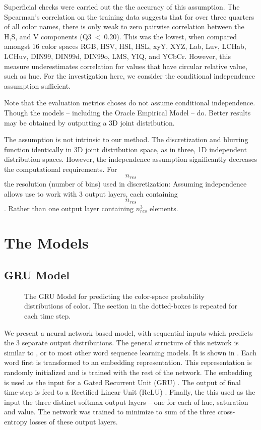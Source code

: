 \documentclass[11pt,letterpaper]{article}
\newcommand{\parencite}{\cite}
\begin{document}
Superficial checks were carried out the the accuracy of this assumption.
The Spearman's correlation on the training data suggests that for over three quarters of all color names, there is only weak to zero pairwise correlation between the H,S, and V components (\mbox{Q3 < 0.20}).
This was the lowest, when compared amongst 16 color spaces RGB, HSV, HSI, HSL, xyY, XYZ, Lab, Luv, LCHab, LCHuv, DIN99, DIN99d, DIN99o, LMS, YIQ, and YCbCr.
However, this measure underestimates correlation for values that have circular relative value, such as hue.
For the investigation here, we consider the conditional independence assumption sufficient.



Note that the evaluation metrics choses do not assume conditional independence.
Though the models -- including the Oracle Empirical Model -- do.
Better results may be obtained by outputting a 3D joint distribution.

The assumption is not intrinsic to our method.
The discretization and blurring function identically in 3D joint distribution space,
as in three, 1D independent distribution spaces.
However, the independence assumption significantly decreases the computational requirements.
For $$n_{res}$$ the resolution (number of bins) used in discretization:
Assuming independence allows use to work with 3 output layers, each containing $$n_{res}$$.
Rather than one output layer containing $n_{res}^3$ elements.


\section{The Models}

\subsection{GRU Model}

\begin{figure}
	\resizebox{\columnwidth}{!}{	}

	\caption{\label{network}
		The GRU Model for predicting the color-space probability distributions of color.
		The section in the dotted-boxes is repeated for each time step.
		}
\end{figure}

We present a neural network based model, with sequential inputs which predicts the 3 separate output distributions. The general structure of this network is similar to \cite{2016arXiv160603821M}, or to most other word sequence learning models.
It is shown in .
Each word first is transformed to an embedding representation.
This representation is randomly initialized and is trained with the rest of the network.
The embedding is used as the input for a Gated Recurrent Unit (GRU) \parencite{cho2014properties,chung2014empirical}.
The output of final time-step is feed to a Rectified Linear Unit (ReLU) \parencite{dahl2013reludropout}.
Finally, the this used as the input the three distinct softmax output layers -- one for each of hue, saturation and value.
The network was trained to minimize to sum of the three cross-entropy losses of these output layers.
\end{document}
